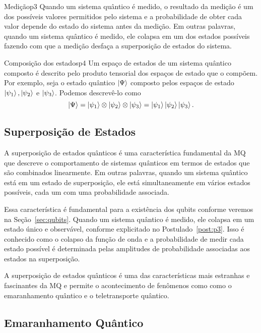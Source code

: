 \begin{post}{Medição}{p3}
Quando um sistema quântico é medido, o resultado da medição é um dos possíveis valores permitidos pelo sistema e a probabilidade de obter cada valor depende do estado do sistema antes da medição. Em outras palavras, quando um sistema quântico é medido, ele colapsa em um dos estados possíveis fazendo com que a medição desfaça a superposição de estados do sistema. 
\end{post}

\begin{post}{Composição dos estados}{p4}
Um espaço de estados de um sistema quântico composto é descrito pelo produto tensorial dos espaços de estado que o compõem. Por exemplo, seja o estado quântico $\ket{\Psi}$ composto pelos espaços de estado $\ket{\psi_1}, \ket{\psi_2}$ e $\ket{\psi_3}$. Podemos descrevê-lo como
\begin{equation}
  \ket{\Psi}=\ket{\psi_1} \otimes \ket{\psi_2} \otimes \ket{\psi_3} = \ket{\psi_1}\ket{\psi_2}\ket{\psi_3}.
\end{equation}
\end{post}

\subsection{Superposição de Estados}\label{sec:superposição}

A superposição de estados quânticos é uma característica fundamental da MQ que descreve o comportamento de sistemas quânticos em termos de estados que são combinados linearmente. Em outras palavras, quando um sistema quântico está em um estado de superposição, ele está simultaneamente em vários estados possíveis, cada um com uma probabilidade associada.

Essa característica é fundamental para a existência dos qubits conforme veremos na Seção~\ref{sec:qubits}. Quando um sistema quântico é medido, ele colapsa em um estado único e observável, conforme explicitado no Postulado~\ref{post:p3}. Isso é conhecido como o colapso da função de onda e a probabilidade de medir cada estado possível é determinada pelas amplitudes de probabilidade associadas aos estados na superposição.

A superposição de estados quânticos é uma das características mais estranhas e fascinantes da MQ e permite o acontecimento de fenômenos como como o emaranhamento quântico e o teletransporte quântico.


\subsection{Emaranhamento Quântico}\label{sec:emaranhamento}

